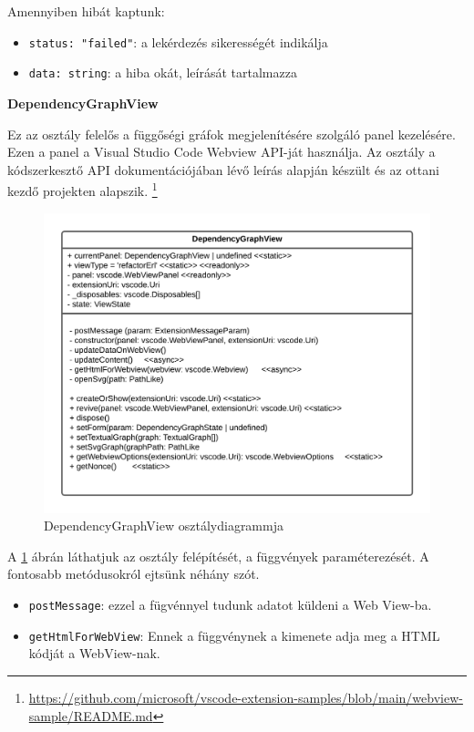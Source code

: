 \noindent Amennyiben hibát kaptunk:
\begin{itemize}
    \item \lstinline{status: "failed"}: a lekérdezés sikerességét indikálja
    \item \lstinline{data: string}: a hiba okát, leírását tartalmazza
\end{itemize}



\vspace{14pt}
\noindent \textbf{DependencyGraphView}


\noindent Ez az osztály felelős a függőségi gráfok megjelenítésére szolgáló panel kezelésére. Ezen a panel a Visual Studio Code Webview API-ját használja. Az osztály a kódszerkesztő API dokumentációjában lévő leírás alapján készült \cite{webViewGuide} és az ottani kezdő projekten alapszik. \footnote{\url{https://github.com/microsoft/vscode-extension-samples/blob/main/webview-sample/README.md}}


\begin{figure}[H]
  \centering
  \includegraphics[width=\linewidth]{images/diagramDepg.png}
  \caption{DependencyGraphView osztálydiagrammja}
  \label{fig:diagramDepg}
\end{figure}

A \ref{fig:diagramDepg} ábrán láthatjuk az osztály felépítését, a függvények paraméterezését. A fontosabb metódusokról ejtsünk néhány szót.

\begin{itemize}
    \item \lstinline{postMessage}: ezzel a fügvénnyel tudunk adatot küldeni a Web View-ba.
    \item \lstinline{getHtmlForWebView}: Ennek a függvénynek a kimenete adja meg a HTML kódját a WebView-nak.
\end{itemize}


